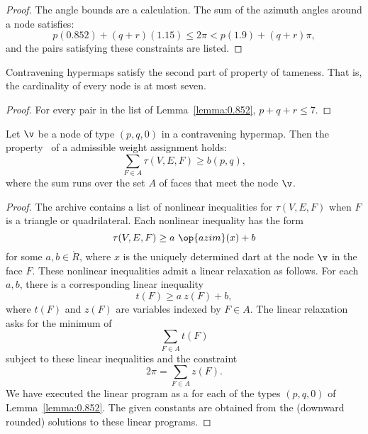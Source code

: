 \begin{proof}
The angle bounds are a calculation.  The sum of the azimuth angles
around a node satisfies:
\[ 
p (0.852) + (q+r) (1.15) \le 2\pi < p (1.9) + (q+r) \pi,
\] 
and the pairs satisfying these constraints are listed.
\end{proof}

\begin{lemma}[]\label{lemma:node-upper}
Contravening hypermaps satisfy the second part of property 
of tameness.  That is, the cardinality of every
node is at most seven.
\end{lemma}

\begin{proof}  For every pair in the list of Lemma~\ref{lemma:0.852},  $p+q+r\le 7$.
\end{proof}




\begin{lemma}[] \label{lemma:weightB}
  Let $\v$ be a node of type $(p,q,0)$ in a contravening hypermap.
  Then the property~ of a admissible weight assignment
  holds:
\[ 
\sum_{ F\in A} \tau(V,E,F) \ge  b(p,q),
\] 
where the sum runs over the set $A$ of faces that meet the node $\v$.
\end{lemma}
%
%

\begin{proof}   The archive
  \cite[FUSDSPJ]{website:FlyspeckProject} contains a list of nonlinear
  inequalities for $\tau(V,E,F)$ when $F$ is a triangle or
  quadrilateral. Each nonlinear inequality has the form
\[ \tau(V,E,F) \ge a~\op{azim}(x) + b\] 
for some $a,b\in\ring{R}$, where $x$ is the uniquely determined dart
at the node $\v$ in the face $F$.  These nonlinear inequalities admit
a linear relaxation as follows.  For each $a,b$, there is a corresponding
linear inequality %
%
\[ 
t(F) \ge a~z(F) + b,
\] 
where $t(F)$ and $z(F)$ are variables indexed by $F\in A$.
%
%
%
The linear relaxation asks for the minimum of 
\[ \sum_{F\in A} t(F)\] 
subject to these linear inequalities and the constraint
\[ 
2\pi = \sum_{F\in A} z(F).
\] 
We have executed the linear program as a 
 for each of the
types $(p,q,0)$ of Lemma~\ref{lemma:0.852}. The given constants are
obtained from the (downward rounded) solutions to these linear
programs.
\end{proof}


